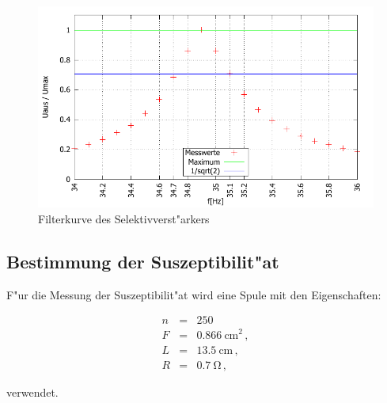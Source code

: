 	\begin{figure}[!h]
		\centering
		\includegraphics[width = 14cm]{img/arschlecken.pdf}
		\caption{Filterkurve des Selektivverst"arkers}
		\label{graph:aufgabe_a}
	\end{figure}

	\clearpage


	\subsection{Bestimmung der Suszeptibilit"at} %
	\label{sub:bestimmung_der_suszeptibilit_t}

	F"ur die Messung der Suszeptibilit"at wird eine Spule mit den Eigenschaften:

	\begin{eqnarray*}
		n &=& 250 \,\\
		F &=& \SI{0.866}{\centi\meter^2} \, ,\\
		L &=& \SI{13.5}{\centi\meter} \, , \\
		R &=& \SI{0.7}{\ohm} \, ,
	\end{eqnarray*}

	verwendet.

	
	
	
	
	

	\clearpage